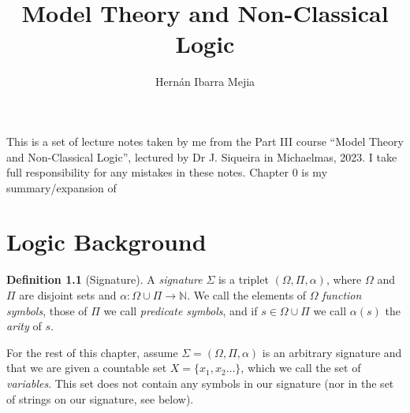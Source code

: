 \documentclass{report}
\theoremstyle{definition}
\theoremstyle{plain}
\theoremstyle{definition}
\newtheorem{defn}[thm]{Definition}
\begin{document}
	\title{Model Theory and Non-Classical Logic}
	\author{Hernán Ibarra Mejia}
	\maketitle
	This is a set of lecture notes taken by me from the Part III course ``Model Theory and Non-Classical Logic'', lectured by Dr J. Siqueira in Michaelmas, 2023. I take full responsibility for any mistakes in these notes. Chapter 0 is my summary/expansion of \cite{NOLAST}
	
	
	\setcounter{chapter}{-1}
	\chapter{Logic Background}
	\begin{defn}[Signature]
		A \emph{signature} $\Sigma$ is a triplet $(\Omega, \Pi, \alpha)$, where $\Omega$ and $\Pi$ are disjoint sets and $\alpha\colon \Omega \cup \Pi \to \mathbb{N}$. We call the elements of $\Omega$ \emph{function symbols}, those of $\Pi$ we call \emph{predicate symbols}, and if $s\in \Omega \cup \Pi$ we call $\alpha(s)$ the \emph{arity} of $s$.
	\end{defn}
	For the rest of this chapter, assume $\Sigma = (\Omega, \Pi, \alpha)$ is an arbitrary signature and that we are given a countable set $X=\{x_1,x_2\ldots\}$, which we call the set of \emph{variables}. This set does not contain any symbols in our signature (nor in the set of strings on our signature, see below).
\end{document}
